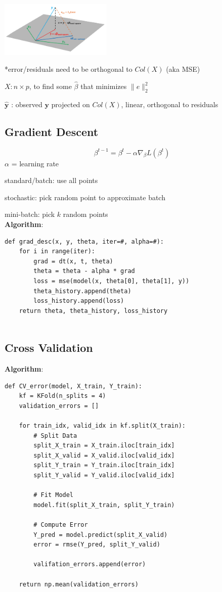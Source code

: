 \documentclass[8pt]{extarticle}
\begin{document}
\includegraphics[width=0.4\textwidth]{leastsquares}\par

*error/residuals need to be orthogonal to $Col(X)$ (aka MSE)\par
$X: n \times p$, to find some $\hat{\beta}$ that minimizes $\|e\|^2_2 $ \par
$\hat{\mathbf{y}}$ : observed $\mathbf{y}$ projected on $Col(X)$, linear, orthogonal to residuals \\
\hline

\subsection*{Gradient Descent}
$$\beta ^{t-1} = \beta^t-\alpha \nabla_\beta L(\beta^t)$$
$\alpha$ = learning rate\par
standard/batch: use all points \par
stochastic: pick random point to approximate batch \par
mini-batch: pick $k$ random points \\

\textbf{Algorithm}:
\begin{verbatim}
def grad_desc(x, y, theta, iter=#, alpha=#):
    for i in range(iter):
        grad = dt(x, t, theta)
        theta = theta - alpha * grad
        loss = mse(model(x, theta[0], theta[1], y))
        theta_history.append(theta)
        loss_history.append(loss)
    return theta, theta_history, loss_history
        
\end{verbatim}
\hline

\subsection*{Cross Validation}
\textbf{Algorithm}:
\begin{verbatim}
def CV_error(model, X_train, Y_train):
    kf = KFold(n_splits = 4)
    validation_errors = []
    
    for train_idx, valid_idx in kf.split(X_train):
        # Split Data
        split_X_train = X_train.iloc[train_idx]
        split_X_valid = X_valid.iloc[valid_idx]
        split_Y_train = Y_train.iloc[train_idx]
        split_Y_valid = Y_valid.iloc[valid_idx]
        
        # Fit Model
        model.fit(split_X_train, split_Y_train)
        
        # Compute Error
        Y_pred = model.predict(split_X_valid)
        error = rmse(Y_pred, split_Y_valid)
        
        valifation_errors.append(error)
        
    return np.mean(validation_errors)

\end{verbatim}
\end{document}
